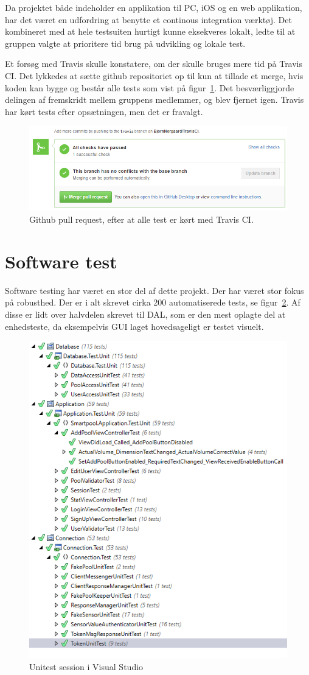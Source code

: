 Da projektet både indeholder en applikation til PC, iOS og en web applikation, har det været en udfordring at benytte et continous integration værktøj.
Det kombineret med at hele testsuiten hurtigt kunne eksekveres lokalt, ledte til at gruppen valgte at prioritere tid brug på udvikling og lokale test.

Et forsøg med Travis skulle konstatere, om der skulle bruges mere tid på Travis CI. 
Det lykkedes at sætte github repositoriet op til kun at tillade et merge, hvis koden kan bygge og består alle tests som vist på figur~\ref{fig:travisgithubsuccess}.
Det besværliggjorde delingen af fremskridt mellem gruppens medlemmer, og blev fjernet igen.
Travis har kørt tests efter opsætningen, men det er fravalgt.

\begin{figure}[h]
	\centering
	\includegraphics[width=0.8\linewidth]{figs/processProjektGennemforsel/travis/travisgithubsuccess}
	\caption{Github pull request, efter at alle test er kørt med Travis CI.}
	\label{fig:travisgithubsuccess}
\end{figure}

\section{Software test}
Software testing har været en stor del af dette projekt. Der har været stor fokus på robusthed. Der er i alt skrevet cirka 200 automatiserede tests, se figur~\ref{fig:vsUnittest}. Af disse er lidt over halvdelen skrevet til DAL, som er den mest oplagte del at enhedsteste, da eksempelvis GUI laget hovedsageligt er testet visuelt.

\begin{figure}[h]
	\centering
	\includegraphics[width=0.5\linewidth]{figs/processProjektGennemforsel/vsUnittest}
	\caption{Unitest session i Visual Studio}
	\label{fig:vsUnittest}
\end{figure}